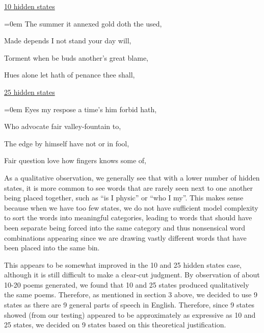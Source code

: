 




\underline{10 hidden states}

{\parskip=0em 
The summer it annexed gold doth the used,

Made depends I not stand your day will,

Torment when be buds another's great blame,

Hues alone let hath of penance thee shall,}

\underline{25 hidden states}

{\parskip=0em 
Eyes my respose a time's him forbid hath,

Who advocate fair valley-fountain to,

The edge by himself have not or in fool,

Fair question love how fingers knows some of,}

As a qualitative observation, we generally see that with a lower number of hidden states, it is more common to see words that are rarely seen next to one another being placed together, such as ``is I physic'' or ``who I my''. This makes sense because when we have too few states, we do not have sufficient model complexity to sort the words into meaningful categories, leading to words that should have been separate being forced into the same category and thus nonsensical word combinations appearing since we are drawing vastly different words that have been placed into the same bin.

This appears to be somewhat improved in the 10 and 25 hidden states case, although it is still difficult to make a clear-cut judgment. By observation of about 10-20 poems generated, we found that 10 and 25 states produced qualitatively the same poems. Therefore, as mentioned in section 3 above, we decided to use 9 states as there are 9 general parts of speech in English. Therefore, since 9 states showed (from our testing) appeared to be approximately as expressive as 10 and 25 states, we decided on 9 states based on this theoretical justification.

